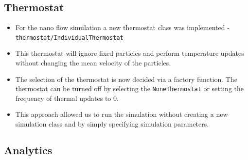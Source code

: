 \documentclass{article}
\begin{document}
    \subsection{Thermostat}
    \label{sec:nano:impl:thermo}
        \begin{itemize}
            \item For the nano flow simulation a new thermostat class was implemented - \texttt{thermostat/IndividualThermostat}
            \item This thermostat will ignore fixed particles and perform temperature updates without changing the mean velocity of the particles.
            \item The selection of the thermostat is now decided via a factory function. The thermostat can be turned off by selecting the \texttt{NoneThermostat} or setting the frequency of thermal updates to 0.
            \item This approach allowed us to run the simulation without creating a new simulation class and by simply specifying simulation parameters.
        \end{itemize}


\subsection{Analytics}
\label{sec:nano:ana}
\end{document}
